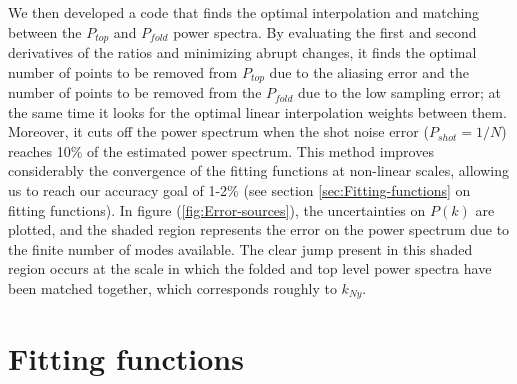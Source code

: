 We then developed a  code that finds the optimal interpolation
and matching between the $P_{top}$ and $P_{fold}$ power spectra.
By evaluating the first and second derivatives of the ratios and minimizing
abrupt changes, it finds the optimal number of points to be removed
from $P_{top}$ due to the aliasing error and the number of points
to be removed from the $P_{fold}$ due to the low sampling error;
at the same time it looks for the optimal linear interpolation weights
between them. Moreover, it cuts off the power spectrum when the shot
noise error ($P_{shot}=1/N$) reaches 10\% of the estimated power
spectrum. This method improves considerably the convergence of the
fitting functions at non-linear scales, allowing us to reach our accuracy
goal of 1-2\% (see section \ref{sec:Fitting-functions} on fitting
functions). In figure (\ref{fig:Error-sources}), the uncertainties
on $P(k)$ are plotted, and the shaded region represents the error
on the power spectrum due to the finite number of modes available.
The clear jump present in this shaded region occurs at the scale in
which the folded and top level power spectra have been matched together,
which corresponds roughly to $k_{Ny}$.




\section{Fitting functions\label{sec:Fitting-functions}}

